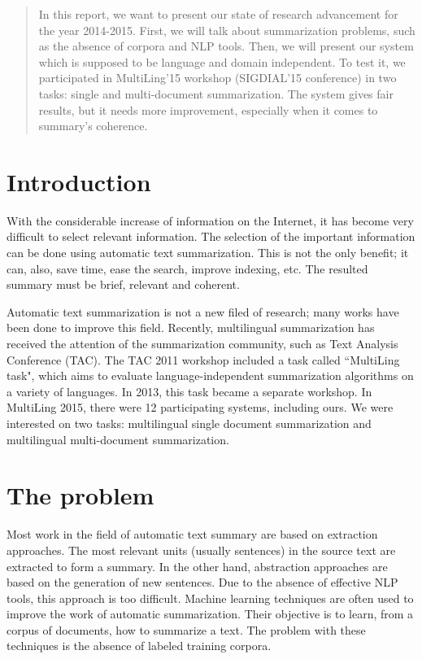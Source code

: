\documentclass{LCSI_PhD}
\begin{document}
\headofpage

\begin{abstract}
In this report, we want to present our state of research advancement for the year 2014-2015. 
First, we will talk about summarization problems, such as the absence of corpora and NLP tools.
Then, we will present our system which is supposed to be language and domain independent. 
To test it, we participated in MultiLing'15 workshop (SIGDIAL'15 conference) in two tasks: single and multi-document summarization.
The system gives fair results, but it needs more improvement, especially when it comes to summary's coherence.
\end{abstract}


\section{Introduction}

With the considerable increase of information on the Internet, it has become very difficult to select relevant information.
The selection of the important information can be done using automatic text summarization. 
This is not the only benefit; it can, also, save time, ease the search, improve indexing, etc.
The resulted summary must be brief, relevant and coherent. 

Automatic text summarization is not a new filed of research; many works have been done to improve this field. 
Recently, multilingual summarization has received the attention of the summarization community, such as Text Analysis Conference (TAC).
The TAC 2011 workshop included a task called ``MultiLing task", which aims to evaluate language-independent summarization algorithms on a variety of languages.
In 2013, this task became a separate workshop.
In MultiLing 2015\cite{15-giannakopoulos-al}, there were 12 participating systems, including ours. 
We were interested on two tasks: multilingual single document summarization and multilingual multi-document summarization.

\section{The problem}

Most work in the field of automatic text summary are based on extraction approaches.
The most relevant units (usually sentences) in the source text are extracted to form  a summary.
In the other hand, abstraction approaches are based on the generation of new sentences.
Due to the absence of effective NLP tools, this approach is too difficult.
Machine learning techniques are often used to improve the work of automatic summarization.
Their objective is to learn, from a corpus of documents, how to summarize a text.
The problem with these techniques is the absence of labeled training corpora.
\end{document}
